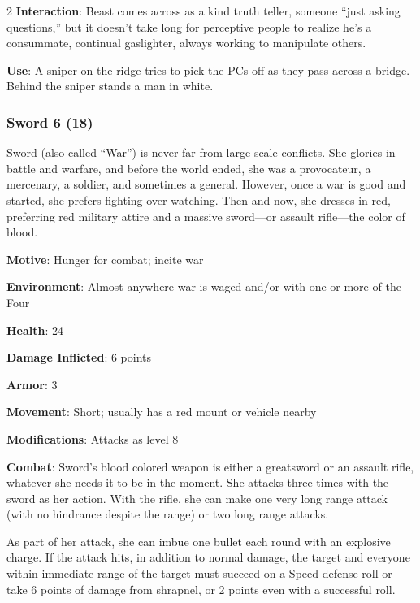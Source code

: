 \begin{multicols}{2}
\textbf{Interaction}: Beast comes across as a kind truth teller, someone “just asking questions,” but it doesn’t take long for perceptive people to realize he’s a consummate, continual gaslighter, always working to manipulate others. 

\textbf{Use}: A sniper on the ridge tries to pick the PCs off as they pass across a bridge. Behind the sniper stands a man in white.

\subsubsection{Sword 6 (18)}

Sword (also called “War”) is never far from large‑scale conflicts. She glories in battle and warfare, and before the world ended, she was a provocateur, a mercenary, a soldier, and sometimes a general. However, once a war is good and started, she prefers fighting over watching. Then and now, she dresses in red, preferring red military attire and a massive sword—or assault rifle—the color of blood.

\textbf{Motive}: Hunger for combat; incite war 

\textbf{Environment}: Almost anywhere war is waged and/or with one or more of the Four 

\textbf{Health}: 24 

\textbf{Damage Inflicted}: 6 points 

\textbf{Armor}: 3 

\textbf{Movement}: Short; usually has a red mount or vehicle nearby 

\textbf{Modifications}: Attacks as level 8 

\textbf{Combat}: Sword’s blood colored weapon is either a greatsword or an assault rifle, whatever she needs it to be in the moment. She attacks three times with the sword as her action. With the rifle, she can make one very long range attack (with no hindrance despite the range) or two long range attacks. 

As part of her attack, she can imbue one bullet each round with an explosive charge. If the attack hits, in addition to normal damage, the target and everyone within immediate range of the target must succeed on a Speed defense roll or take 6 points of damage from shrapnel, or 2 points even with a successful roll. 


\end{multicols}
